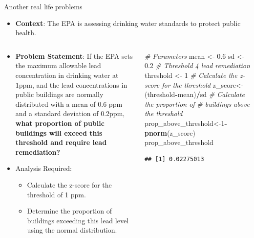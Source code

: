 \documentclass[
  ignorenonframetext,
]{beamer}
\newenvironment{Shaded}{\begin{snugshade}}{\end{snugshade}}
\newcommand{\CommentTok}[1]{\textcolor[rgb]{0.56,0.35,0.01}{\textit{#1}}}
\newcommand{\DecValTok}[1]{\textcolor[rgb]{0.00,0.00,0.81}{#1}}
\newcommand{\FloatTok}[1]{\textcolor[rgb]{0.00,0.00,0.81}{#1}}
\newcommand{\FunctionTok}[1]{\textcolor[rgb]{0.13,0.29,0.53}{\textbf{#1}}}
\newcommand{\NormalTok}[1]{#1}
\newcommand{\OtherTok}[1]{\textcolor[rgb]{0.56,0.35,0.01}{#1}}
\newcommand{\SpecialCharTok}[1]{\textcolor[rgb]{0.81,0.36,0.00}{\textbf{#1}}}
\providecommand{\tightlist}{%
  \setlength{\itemsep}{0pt}\setlength{\parskip}{0pt}}
\begin{document}
\begin{frame}[fragile]{Another real life problems}
\label{another-real-life-problems}
\begin{itemize}
\tightlist
\item
  \textbf{Context}: The EPA is assessing drinking water standards to
  protect public health.
\end{itemize}

\begin{columns}[T]
\begin{column}{0.5\textwidth}
\begin{itemize}
\item
  \textbf{Problem Statement}: If the EPA sets the maximum allowable lead
  concentration in drinking water at 1ppm, and the lead concentrations
  in public buildings are normally distributed with a mean of 0.6 ppm
  and a standard deviation of 0.2ppm, \textbf{what proportion of public
  buildings will exceed this threshold and require lead remediation?}
\item
  Analysis Required:

  \begin{itemize}
  \tightlist
  \item
    Calculate the z-score for the threshold of 1 ppm.
  \item
    Determine the proportion of buildings exceeding this lead level
    using the normal distribution. \vspace{1cm}
  \end{itemize}
\end{itemize}
\end{column}

\begin{column}{0.5\textwidth}
\vspace{1cm}

\begin{Shaded}
\begin{Highlighting}[]
\CommentTok{\# Parameters}
\NormalTok{mean }\OtherTok{\textless{}{-}} \FloatTok{0.6}
\NormalTok{sd }\OtherTok{\textless{}{-}} \FloatTok{0.2}
\CommentTok{\# Threshold 4 lead remediation}
\NormalTok{threshold }\OtherTok{\textless{}{-}} \DecValTok{1}
\CommentTok{\# Calculate the z{-}score for the threshold}
\NormalTok{z\_score}\OtherTok{\textless{}{-}}\NormalTok{(threshold}\SpecialCharTok{{-}}\NormalTok{mean)}\SpecialCharTok{/}\NormalTok{sd}
\CommentTok{\# Calculate the proportion of }
\CommentTok{\# buildings above the threshold}
\NormalTok{prop\_above\_threshold}\OtherTok{\textless{}{-}}\DecValTok{1}\SpecialCharTok{{-}}\FunctionTok{pnorm}\NormalTok{(z\_score)}
\NormalTok{prop\_above\_threshold}
\end{Highlighting}
\end{Shaded}

\begin{verbatim}
## [1] 0.02275013
\end{verbatim}
\end{column}
\end{columns}
\end{frame}
\end{document}

